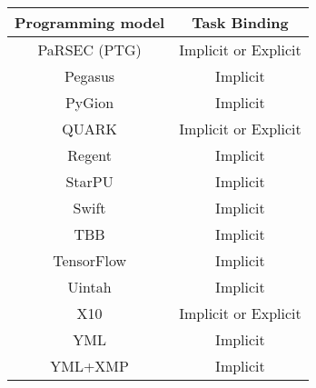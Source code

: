 \begin{tabular}{cc}
\hline
Programming model & Task Binding \\
\hline
PaRSEC (PTG) & Implicit or Explicit\\
Pegasus & Implicit\\
PyGion & Implicit\\
QUARK & Implicit or Explicit\\
Regent & Implicit\\
StarPU & Implicit\\
Swift & Implicit\\
TBB & Implicit\\
TensorFlow & Implicit\\
Uintah & Implicit\\
X10 & Implicit or Explicit\\
YML & Implicit\\
YML+XMP & Implicit\\
\hline
\end{tabular}

